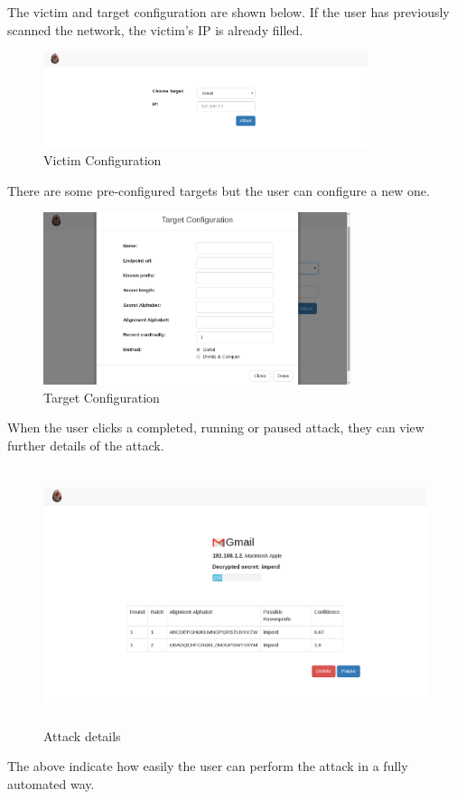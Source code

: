 The victim and target configuration are shown below. If the user has previously scanned 
the network, the victim's IP is already filled.

\begin{figure}[H] \caption{Victim Configuration} \centering 
\includegraphics[width=95mm]{diagrams/victim.png} \end{figure}

There are some pre-configured targets but the user can configure a 
new one.


\begin{figure}[H]
    \centering
    \includegraphics[width=90mm]{diagrams/target.png}
    \caption{Target Configuration}
\end{figure}

When the user clicks a completed, running or paused attack, 
they can view further details of the attack.

\begin{figure}[H]
    \centering
    \includegraphics[width=115mm, height=75mm]{diagrams/attack.png}
    \caption{Attack details}
\end{figure}

The above indicate how easily the user can perform the attack in a fully automated way.
